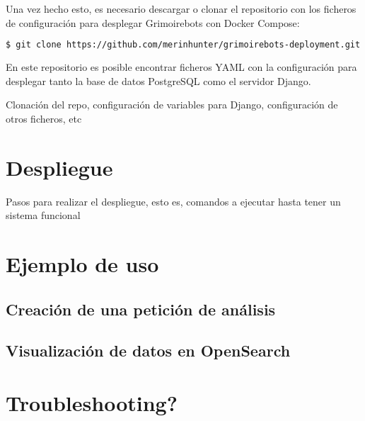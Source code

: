 Una vez hecho esto, es necesario descargar o clonar el repositorio con los ficheros de configuración para desplegar Grimoirebots con Docker Compose:

\begin{lstlisting}[language=bash]
$ git clone https://github.com/merinhunter/grimoirebots-deployment.git
\end{lstlisting}

En este repositorio es posible encontrar ficheros YAML con la configuración para desplegar tanto la base de datos PostgreSQL como el servidor Django.

Clonación del repo, configuración de variables para Django, configuración de otros ficheros, etc

\section{Despliegue}

Pasos para realizar el despliegue, esto es, comandos a ejecutar hasta tener un sistema funcional

\section{Ejemplo de uso}

\subsection{Creación de una petición de análisis}

\subsection{Visualización de datos en OpenSearch}

\section{Troubleshooting?}
